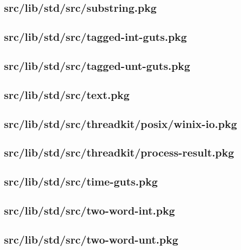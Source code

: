 \subsection{src/lib/std/src/substring.pkg}


\subsection{src/lib/std/src/tagged-int-guts.pkg}


\subsection{src/lib/std/src/tagged-unt-guts.pkg}


\subsection{src/lib/std/src/text.pkg}


\subsection{src/lib/std/src/threadkit/posix/winix-io.pkg}


\subsection{src/lib/std/src/threadkit/process-result.pkg}


\subsection{src/lib/std/src/time-guts.pkg}


\subsection{src/lib/std/src/two-word-int.pkg}


\subsection{src/lib/std/src/two-word-unt.pkg}


